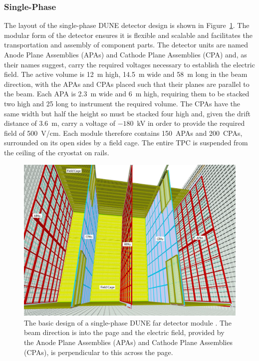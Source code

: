 \subsubsection{Single-Phase}\label{sec:DUNESinglePhase}

The layout of the single-phase DUNE detector design is shown in Figure~\ref{fig:DUNEFarDetectorDesign}.  The modular form of the detector ensures it is flexible and scalable and facilitates the transportation and assembly of component parts.  The detector units are named Anode Plane Assemblies (APAs) and Cathode Plane Assemblies (CPA) and, as their names suggest, carry the required voltages necessary to establish the electric field.  The active volume is 12~m high, 14.5~m wide and 58~m long in the beam direction, with the APAs and CPAs placed such that their planes are parallel to the beam.  Each APA is 2.3~m wide and 6~m high, requiring them to be stacked two high and 25 long to instrument the required volume.  The CPAs have the same width but half the height so must be stacked four high and, given the drift distance of 3.6~m, carry a voltage of $-180$~kV in order to provide the required field of 500~V/cm.  Each module therefore contains 150~APAs and 200~CPAs, surrounded on its open sides by a field cage.  The entire TPC is suspended from the ceiling of the cryostat on rails.

\begin{figure}
  \centering
  \includegraphics[width=14cm]{DUNEFarDetectorDesign.png}
  \caption[The basic design of a single-phase DUNE far detector module.]{The basic design of a single-phase DUNE far detector module \cite{DUNECDR4}.  The beam direction is into the page and the electric field, provided by the Anode Plane Assemblies (APAs) and Cathode Plane Assemblies (CPAs), is perpendicular to this across the page.}
  \label{fig:DUNEFarDetectorDesign}
\end{figure}


